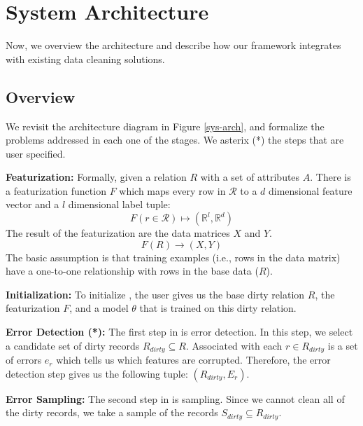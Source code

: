 \section{System Architecture}\label{arch}
Now, we overview the \sys architecture and describe how our framework integrates with existing data cleaning solutions.

\subsection{Overview}
We revisit the architecture diagram in Figure \ref{sys-arch}, and formalize
the problems addressed in each one of the stages. 
We asterix (*) the steps that are user specified.

\vspace{0.5em}

\noindent \textbf{Featurization: } Formally, given a relation $R$ with a set of attributes $A$.
There is a featurization function $F$ which maps every row in $\mathcal{R}$ to a $d$ dimensional feature vector and a $l$ dimensional label tuple: 
\[F(r \in \mathcal{R}) \mapsto (\mathbb{R}^l, \mathbb{R}^d)\]
The result of the featurization are the data matrices $X$ and $Y$.
\[
F(R)\rightarrow (X,Y)
\]
The basic assumption is that training examples (i.e., rows in the data matrix) have a one-to-one relationship with rows in the base data ($R$).

\vspace{0.5em}

\noindent\textbf{Initialization: } To initialize \sys, the user gives us the base dirty relation $R$, the featurization $F$, and a model $\theta$ that is trained on this dirty relation.

\vspace{0.5em}

\noindent\textbf{Error Detection (*): } The first step in \sys is error detection. In this step, we select a candidate set of dirty records $R_{dirty} \subseteq R$.  
Associated with each $r \in R_{dirty}$ is a set of errors $e_r$ which tells us which features are corrupted.
Therefore, the error detection step gives us the following tuple: $(R_{dirty},E_r)$.

\vspace{0.5em}

\noindent\textbf{Error Sampling: } The second step in \sys is sampling. Since we cannot clean all of the dirty records, we take a sample of the records $S_{dirty} \subseteq R_{dirty}$.

\vspace{0.5em}

